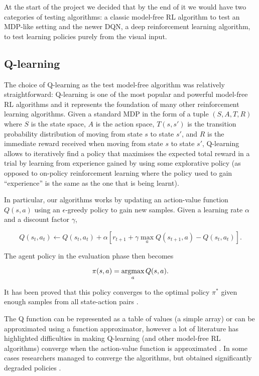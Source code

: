 At the start of the project we decided that by the end of it we would have two
categories of testing algorithms: a classic model-free RL algorithm to test an
MDP-like setting and the newer DQN, a deep reinforcement learning algorithm, to
test learning policies purely from the visual input.

\subsection{Q-learning}

The choice of Q-learning as the test model-free algorithm was relatively
straightforward: Q-learning \citep{watkins1992q} is one of the most popular and
powerful model-free RL algorithms and it represents the foundation of many other
reinforcement learning algorithms. Given a standard MDP in the form of a tuple
$(S, A, T, R)$ where $S$ is the state space, $A$ is the action space, $T(s, s')$
is the transition probability distribution of moving from state $s$ to state
$s'$, and $R$ is the immediate reward received when moving from state $s$ to
state $s'$, Q-learning allows to iteratively find a policy that maximises the
expected total reward in a trial by learning from experience gained by using
some explorative policy (as opposed to on-policy reinforcement learning where
the policy used to gain ``experience'' is the same as the one that is being
learnt).

In particular, our algorithms works by updating an action-value function $Q(s,
a)$ using an $\epsilon$-greedy policy to gain new samples. Given a learning rate
$\alpha$ and a discount factor $\gamma$,

\begin{equation}
  Q(s_t, a_t) \leftarrow Q(s_t, a_t) +
  \alpha \left[ r_{t+1} + \gamma \max_a Q(s_{t+1}, a) - Q(s_t, a_t) \right].
\label{eq:ql}
\end{equation}

The agent policy in the evaluation phase then becomes

\begin{equation}
  \pi(s, a) = \operatornamewithlimits{argmax}_a Q(s, a).
\label{eq:ql2}
\end{equation}

It has been proved that this policy converges to the optimal policy $\pi^*$ given
enough samples from all state-action pairs
\citep{Sutton:1998:IRL:551283}. %

The Q function can be represented as a table of values (a simple array) or can
be approximated using a function approximator, however a lot of literature has
highlighted difficulties in making Q-learning (and other model-free RL
algorithms) converge when the action-value function is approximated
\citep{sutton1999policy}. In some cases researchers managed to converge the
algorithms, but obtained significantly degraded policies
\citep{bertsekas2011approximate, baxter1999direct}.

